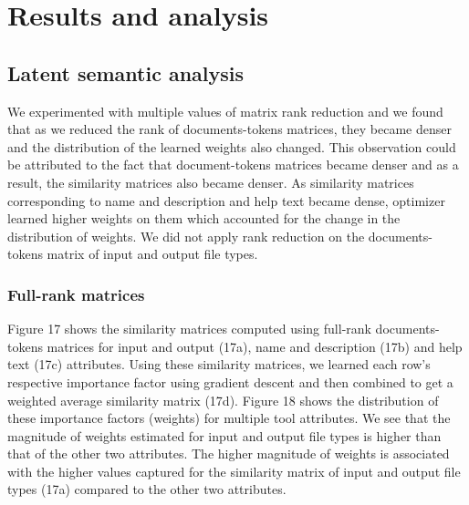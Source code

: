 \chapter{Results and analysis}
\section{Latent semantic analysis}
We experimented with multiple values of matrix rank reduction and we found that as we reduced the rank of documents-tokens matrices, they became denser and the distribution of the learned weights also changed. This observation could be attributed to the fact that document-tokens matrices became denser and as a result, the similarity matrices also became denser. As similarity matrices corresponding to name and description and help text became dense, optimizer learned higher weights on them which accounted for the change in the distribution of weights. We did not apply rank reduction on the documents-tokens matrix of input and output file types.

\subsection{Full-rank matrices}
Figure 17 shows the similarity matrices computed using full-rank documents-tokens matrices for input and output (17a), name and description (17b) and help text (17c) attributes. Using these similarity matrices, we learned each row's respective importance factor using gradient descent and then combined to get a weighted average similarity matrix (17d). Figure 18 shows the distribution of these importance factors (weights) for multiple tool attributes. We see that the magnitude of weights estimated for input and output file types is higher than that of the other two attributes. The higher magnitude of weights is associated with the higher values captured for the similarity matrix of input and output file types (17a) compared to the other two attributes.

